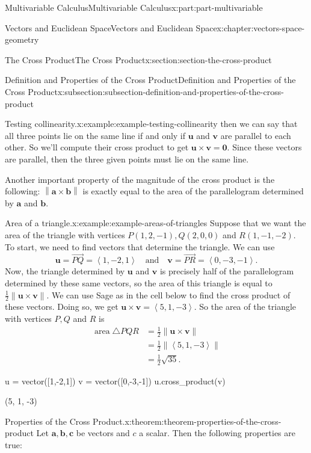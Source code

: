 \documentclass[twoside,10pt,]{book}
\numberwithin{equation}{part}
\newcommand{\norm}[1]{\left\| #1 \right\|}
\newcommand{\dotprod}[1]{\left\langle #1 \right\rangle}
\begin{document}
\begin{partptx}{Multivariable Calculus}{}{Multivariable Calculus}{}{}{x:part:part-multivariable}
\begin{chapterptx}{Vectors and Euclidean Space}{}{Vectors and Euclidean Space}{}{}{x:chapter:vectors-space-geometry}
\begin{sectionptx}{The Cross Product}{}{The Cross Product}{}{}{x:section:section-the-cross-product}
\begin{subsectionptx}{Definition and Properties of the Cross Product}{}{Definition and Properties of the Cross Product}{}{}{x:subsection:subsection-definition-and-properties-of-the-cross-product}
\begin{example}{Testing collinearity.}{x:example:example-testing-collinearity}
then we can say that all three points lie on the same line if and only if \(\mathbf{u}\) and \(\mathbf{v}\) are parallel to each other. So we'll compute their cross product to get \(\mathbf{u}\times\mathbf{v} = \mathbf{0}\). Since these vectors are parallel, then the three given points must lie on the same line.%
\end{example}
Another important property of the magnitude of the cross product is the following: \(\norm{\mathbf{a}\times\mathbf{b}}\) is exactly equal to the area of the parallelogram determined by \(\mathbf{a}\) and \(\mathbf{b}\).%
\begin{example}{Area of a triangle.}{x:example:example-areas-of-triangles}%
Suppose that we want the area of the triangle with vertices \(P(1,2,-1), Q(2,0,0)\) and \(R(1,-1,-2)\). To start, we need to find vectors that determine the triangle. We can use%
%
\begin{equation*}
\mathbf{u} = \vec{PQ} = \dotprod{1,-2,1}\quad\text{and}\quad\mathbf{v} = \vec{PR} = \dotprod{0,-3,-1}.
\end{equation*}
Now, the triangle determined by \(\mathbf{u}\) and \(\mathbf{v}\) is precisely half of the parallelogram determined by these same vectors, so the area of this triangle is equal to \(\frac{1}{2}\norm{\mathbf{u}\times\mathbf{v}}\). We can use Sage as in the cell below to find the cross product of these vectors. Doing so, we get \(\mathbf{u}\times\mathbf{v} = \dotprod{5,1,-3}.\) So the area of the triangle with vertices \(P,Q\) and \(R\) is%
%
\begin{align*}
\operatorname{area} \triangle PQR & = \frac{1}{2}\norm{\mathbf{u}\times\mathbf{v}} \\
& = \frac{1}{2}\norm{\dotprod{5,1,-3}} \\
& = \frac{1}{2}\sqrt{35}. 
\end{align*}
\end{example}
\begin{sageinput}
u = vector([1,-2,1])
v = vector([0,-3,-1])
u.cross_product(v)
\end{sageinput}
\begin{sageoutput}
(5, 1, -3)
\end{sageoutput}
\begin{theorem}{Properties of the Cross Product.}{}{x:theorem:theorem-properties-of-the-cross-product}%
%
Let \(\mathbf{a},\mathbf{b},\mathbf{c}\) be vectors and \(c\) a scalar. Then the following properties are true:%
%
\begin{multicols}{2}

\end{multicols}
\end{theorem}
\end{subsectionptx}
\end{sectionptx}
\end{chapterptx}
\end{partptx}
\end{document}
